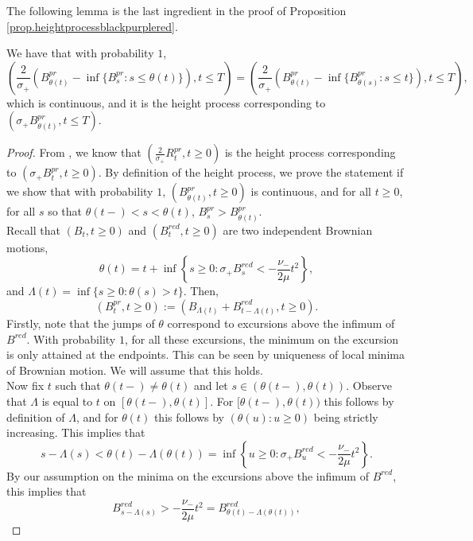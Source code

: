 The following lemma is the last ingredient in the proof of Proposition \ref{prop.heightprocessblackpurplered}.
\begin{lemma}\label{lemma.heightprocesstimechange}
We have that with probability $1$, $$\left(\frac{2}{\sigma_+} \left(B^{pr}_{\theta (t)}-\inf\{B^{pr}_{s}:s\leq \theta(t)\}\right), t\leq T \right)=\left(\frac{2}{\sigma_+} \left(B^{pr}_{\theta (t)}-\inf\{B^{pr}_{\theta(s)}:s\leq t\}\right), t\leq T \right),$$ which is continuous, and it is the height process corresponding to $\left(\sigma_+ B^{pr}_{\theta (t)},t\leq T\right)$. 
\end{lemma}
\begin{proof}
From \cite{legallRandomTreesApplications2005}, we know that $\left(\frac{2}{\sigma_+}R^{pr}_t,t\geq 0\right)$ is the height process corresponding to $\left(\sigma_+ B^{pr}_{t},t\geq 0\right)$. By definition of the height process, we prove the statement if we show that with probability $1$, $(B^{pr}_{\theta(t)},t\geq 0)$ is continuous, and for all $t\geq 0$, for all $s$ so that $\theta(t-)<s<\theta(t)$, $ B^{pr}_s > B^{pr}_{\theta(t)}$. \\
Recall that $(B_t, t \geq 0)$ and $(B^{red}_t, t\geq 0)$ are two independent Brownian motions, $$\theta(t)=t+\inf\left\{s\geq 0 : \sigma_+ B^{red}_s< -\frac{\nu_-}{2\mu} t^2\right\},$$ and $\Lambda(t)=\inf\{s\geq 0:\theta(s)> t\}$. Then, \begin{equation*}\left(B^{pr}_t,t \geq 0\right):=\left( B_{\Lambda(t)}+ B^{red}_{t-\Lambda(t)}, t\geq 0\right).\end{equation*}
Firstly, note that the jumps of $\theta$ correspond to excursions above the infimum of $B^{red}$.  With probability $1$, for all these excursions, the minimum on the excursion is only attained at the endpoints. This can be seen by uniqueness of local minima of Brownian motion. We will assume that this holds.\\
Now fix $t$ such that $\theta(t-)\neq \theta(t)$ and let $s\in (\theta(t-),\theta(t))$. Observe that $\Lambda$ is equal to $t$ on $[\theta(t-),\theta(t)]$. For $[\theta(t-),\theta(t))$ this follows by definition of $\Lambda$, and for $\theta(t)$ this follows by $(\theta(u):u\geq 0)$ being strictly increasing. This implies that $$s-\Lambda(s)<\theta(t)-\Lambda(\theta(t))=\inf\left\{ u\geq 0: \sigma_+ B_u^{red}<-\frac{\nu_-}{2\mu} t^2\right\}.$$ By our assumption on the minima on the excursions above the infimum of $B^{red}$, this implies that $$B^{red}_{s-\Lambda(s)}>-\frac{\nu_-}{2\mu} t^2=B^{red}_{\theta(t)-\Lambda(\theta(t))},$$

\end{proof}

